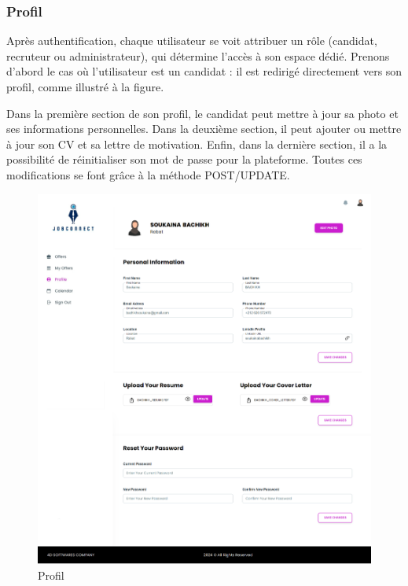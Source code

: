 \subsubsection{Profil}
Après authentification, chaque utilisateur se voit attribuer un  rôle (candidat, recruteur ou administrateur),  qui  détermine  l'accès  à son  espace dédié. Prenons d'abord le cas où l'utilisateur est un candidat : il est redirigé directement vers son profil, comme illustré à la figure.
\newline

Dans la première section de son profil, le  candidat peut mettre à jour sa photo et ses informations personnelles. Dans la  deuxième section, il  peut ajouter ou mettre à jour son CV et sa lettre  de  motivation.  Enfin,  dans  la  dernière section, il a la possibilité de réinitialiser son mot de passe pour la plateforme. Toutes ces modifications se font grâce à la méthode POST/UPDATE.
\newline


\begin{figure}[htbp]
   \centering
   \includegraphics[scale=0.3]{screens/profile.png} 
   \caption{Profil}
   \label{fig:profile}
\end{figure}

